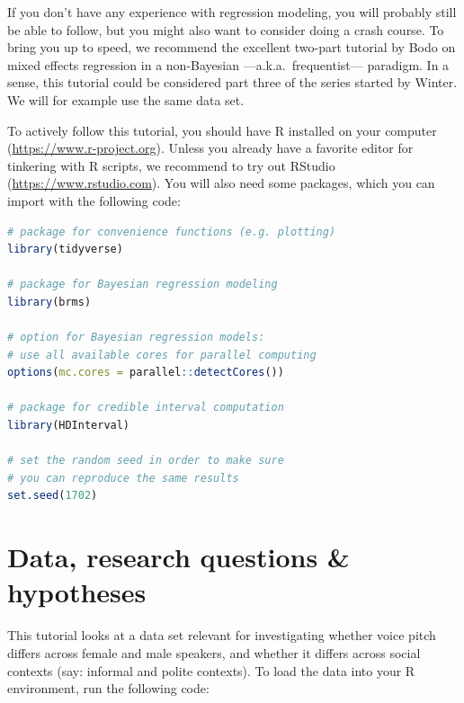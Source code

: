 \documentclass[nobib]{tufte-handout}
\begin{document}
If you don’t have any experience with regression modeling, you will probably still be able to follow, but you might also want to consider doing a crash course. To bring you up to speed, we recommend the excellent two-part tutorial by Bodo \citet{Winter2013:Linear-models-a} on mixed effects regression in a non-Bayesian ---a.k.a.~frequentist--- paradigm. In a sense, this tutorial could be considered part three of the series started by Winter. We will for example use the same data set.

To actively follow this tutorial, you should have R installed on your computer (\url{https://www.r-project.org}).
Unless you already have a favorite editor for tinkering with R scripts, we recommend to try out RStudio (\url{https://www.rstudio.com}).
You will also need some packages,
which you can import with the following code:

\bigskip

\begin{minipage}[]{\textwidth}
\begin{lstlisting}[language=R]
# package for convenience functions (e.g. plotting)
library(tidyverse)

# package for Bayesian regression modeling
library(brms)

# option for Bayesian regression models: 
# use all available cores for parallel computing
options(mc.cores = parallel::detectCores())

# package for credible interval computation
library(HDInterval)

# set the random seed in order to make sure 
# you can reproduce the same results
set.seed(1702)
\end{lstlisting}
\end{minipage}

\section{Data, research questions \& hypotheses}
\label{sec:data}

This tutorial looks at a data set relevant for investigating whether voice pitch differs across female and male speakers, and whether it differs across social contexts (say: informal and polite contexts).
To load the data into your R environment, run the following code:
%
%
\end{document}
